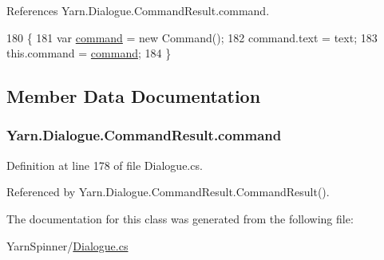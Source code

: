 References Yarn.\-Dialogue.\-Command\-Result.\-command.


\begin{DoxyCode}
180                                                \{
181                 var \hyperlink{a00051_a420ca0984d6e5c33bb761654305c592e}{command} = \textcolor{keyword}{new} Command();
182                 command.text = text;
183                 this.command = \hyperlink{a00051_a420ca0984d6e5c33bb761654305c592e}{command};
184             \}
\end{DoxyCode}


\subsection{Member Data Documentation}
\hypertarget{a00051_a420ca0984d6e5c33bb761654305c592e}{
\subsubsection[{command}]{ Yarn.\-Dialogue.\-Command\-Result.\-command}}\label{a00051_a420ca0984d6e5c33bb761654305c592e}


Definition at line 178 of file Dialogue.\-cs.



Referenced by Yarn.\-Dialogue.\-Command\-Result.\-Command\-Result().



The documentation for this class was generated from the following file\-:\begin{DoxyCompactItemize}
\item 
Yarn\-Spinner/\hyperlink{a00285}{Dialogue.\-cs}\end{DoxyCompactItemize}
